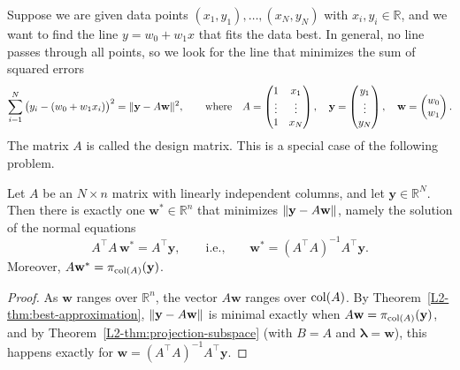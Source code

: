 Suppose we are given data points $(x_1, y_1), \ldots, (x_N, y_N)$ with $x_i, y_i \in \mathbb{R}$, and we want to find the line $y = w_0 + w_1 x$ that fits the data best. In general, no line passes through all points, so we look for the line that minimizes the sum of squared errors
\[\sum_{i=1}^N \big(y_i - (w_0 + w_1 x_i)\big)^2 = \lVert \mathbf{y} - A\mathbf{w} \rVert^2, \qquad \text{where} \quad A = \begin{pmatrix} 1 & x_1 \\ \vdots & \vdots \\ 1 & x_N \end{pmatrix}, \quad \mathbf{y} = \begin{pmatrix} y_1 \\ \vdots \\ y_N \end{pmatrix}, \quad \mathbf{w} = \begin{pmatrix} w_0 \\ w_1 \end{pmatrix}.\]
The matrix $A$ is called the design matrix. This is a special case of the following problem.

\begin{theorem}\label{L2-thm:least-squares}
    Let $A$ be an $N \times n$ matrix with linearly independent columns, and let $\mathbf{y} \in \mathbb{R}^N$. Then there is exactly one $\mathbf{w}^* \in \mathbb{R}^n$ that minimizes $\lVert \mathbf{y} - A\mathbf{w} \rVert$, namely the solution of the normal equations
    \[A^\top A \, \mathbf{w}^* = A^\top \mathbf{y}, \qquad \text{i.e.,} \qquad \mathbf{w}^* = (A^\top A)^{-1} A^\top \mathbf{y}.\]
    Moreover, $A\mathbf{w}^* = \pi_{\operatorname{col}(A)}(\mathbf{y})$.
\end{theorem}

\begin{proof}
    As $\mathbf{w}$ ranges over $\mathbb{R}^n$, the vector $A\mathbf{w}$ ranges over $\operatorname{col}(A)$. By Theorem~\ref{L2-thm:best-approximation}, $\lVert \mathbf{y} - A\mathbf{w} \rVert$ is minimal exactly when $A\mathbf{w} = \pi_{\operatorname{col}(A)}(\mathbf{y})$, and by Theorem~\ref{L2-thm:projection-subspace} (with $B = A$ and $\boldsymbol{\lambda} = \mathbf{w}$), this happens exactly for $\mathbf{w} = (A^\top A)^{-1} A^\top \mathbf{y}$.
\end{proof}

